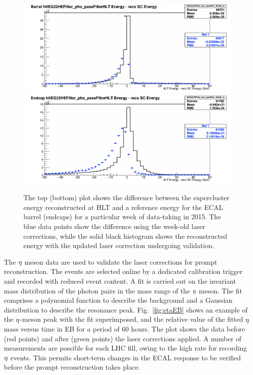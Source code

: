 \begin{figure}\centering
\includegraphics[width=.9\textwidth]{figs/cms/Week42_transpCorr_EB_overlay_IntermediateBlack_oldBlue.png}\\
\includegraphics[width=.9\textwidth]{figs/cms/Week41_transpCorr_EE_overlay_newBlack_oldBlue.png}
\caption{The top (bottom) plot shows the difference between the supercluster energy
  reconstructed at HLT and a reference energy for the ECAL barrel (endcaps) for a particular
  week of data-taking in 2015. The blue data points show the
  difference using the week-old laser corrections, while the solid black histogram shows the reconstructed energy with the
  updated laser correction undergoing validation.\label{fig:ECALHLT}}
\end{figure}

The $\eta$ meson data are used to validate the laser corrections for prompt reconstruction. The events are
selected online by a dedicated calibration trigger and recorded with
reduced event content. A fit is carried out on the invariant mass distribution of the photon
pairs in the mass range of the $\eta$ meson. The fit comprises a
polynomial function to describe the background and a Gaussian
distribution to describe the resonance peak. Fig.~\ref{fig:etaEB}
shows an example of the $\eta$-meson peak with the fit superimposed,
and the relative value of the fitted $\eta$ mass versus time in EB for
a period of 60 hours. The plot shows the data before (red points) and
after (green points) the laser corrections applied. A number of
measurements are possible for each LHC fill, owing to the high
rate for recording $\eta$ events. This permits short-term changes in
the ECAL response to be verified before the prompt reconstruction
takes place.

